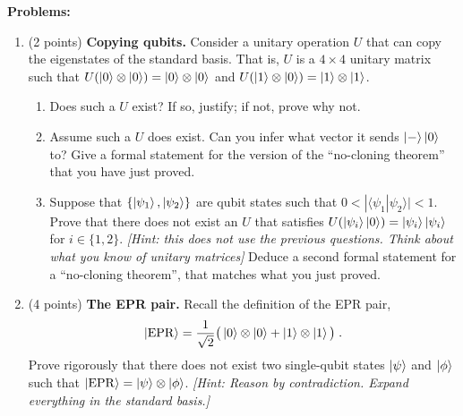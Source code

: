 \documentclass[12pt]{article}
\begin{document}
 
\medskip
{\bf Problems:}
\begin{enumerate}

\item (2 points) {\bf Copying qubits.}
Consider a unitary operation $U$ that can copy the eigenstates of the standard basis. That is, $U$ is a $4\times 4$ unitary matrix such that $U (\ket{0} \otimes \ket{0}) = \ket{0}\otimes  \ket{0}$ and $U (\ket{1} \otimes\ket{0}) = \ket{1} \otimes \ket{1}$. 
\begin{enumerate}
\item Does such a $U$ exist? If so, justify; if not, prove why not. 
\item Assume such a $U$ does exist. Can you infer what vector it sends $\ket{-} \ket{0}$ to? Give a formal statement for the version of the ``no-cloning theorem'' that you have just proved. 
\item Suppose that $\{\ket{\psi_1},\ket{\psi_2}\}$ are qubit states such that $0<|\langle \psi_1 | \psi_2 \rangle | <1$. Prove that there does not exist an $U$ that satisfies $U(\ket{\psi_i}\ket{0})=\ket{\psi_i}\ket{\psi_i}$ for $i\in\{1,2\}$. \emph{[Hint: this does not use the previous questions. Think about what you know of unitary matrices]} Deduce a second formal statement for a ``no-cloning theorem'', that matches what you just proved.    
\end{enumerate}

\item (4 points) {\bf The EPR pair.}
Recall the definition of the EPR pair,
\[ \ket{\mathrm{EPR}} = \frac{1}{\sqrt{2}} \big( \ket{0} \otimes \ket{0} + \ket{1}\otimes \ket{1}\big)\;.\]
Prove rigorously that there does not exist two single-qubit states $\ket{\psi}$ and $\ket{\phi}$ such that $\ket{\mathrm{EPR}} = \ket{\psi} \otimes \ket{\phi}$. \emph{[Hint: Reason by contradiction. Expand everything in the standard basis.]}

\end{enumerate}
\end{document}
